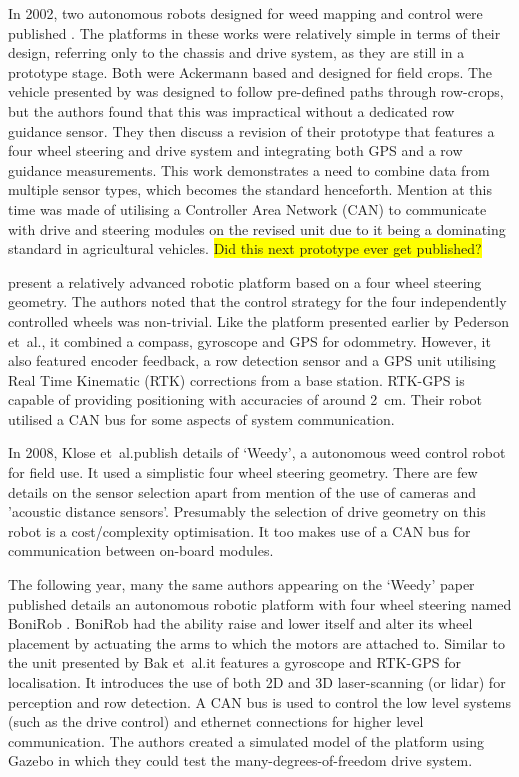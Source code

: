\documentclass[preprint,authoryear,12pt]{elsarticle}
\begin{document}
    In 2002, two autonomous robots designed for weed mapping and control were published \citep{Pedersen2002,Astrand2002}.
    The platforms in these works were relatively simple in terms of their design, referring only to the chassis and drive system, as they are still in a prototype stage.
    Both were Ackermann based and designed for field crops.
    The vehicle presented by \cite{Pedersen2002} was designed to follow pre-defined paths through row-crops, but the authors found that this was impractical without a dedicated row guidance sensor.
    They then discuss a revision of their prototype that features a four wheel steering and drive system and integrating both GPS and a row guidance measurements.
    This work demonstrates a need to combine data from multiple sensor types, which becomes the standard henceforth.
    Mention at this time was made of utilising a Controller Area Network (CAN) to communicate with drive and steering modules on the revised unit due to it being a dominating standard in agricultural vehicles.
    \colorbox{yellow}{Did this next prototype ever get published?}
    
    
    \cite{Bak2004} present a relatively advanced robotic platform based on a four wheel steering geometry.
    The authors noted that the control strategy for the four independently controlled wheels was non-trivial.
    Like the platform presented earlier by Pederson et~al.\@, it combined a compass, gyroscope and GPS for odommetry.
    However, it also featured encoder feedback, a row detection sensor and a GPS unit utilising Real Time Kinematic (RTK) corrections from a base station.
    RTK-GPS is capable of providing positioning with accuracies of around \SI{2}{\centi\meter}.
    Their robot utilised a CAN bus for some aspects of system communication.

    In 2008, Klose et~al.\@ publish details of `Weedy', a autonomous weed control robot for field use.
    It used a simplistic four wheel steering geometry.
    There are few details on the sensor selection apart from mention of the use of cameras and 'acoustic distance sensors'.
    Presumably the selection of drive geometry on this robot is a cost/complexity optimisation.
    It too makes use of a CAN bus for communication between on-board modules.

    The following year, many the same authors appearing on the `Weedy' paper published details an autonomous robotic platform with four wheel steering named BoniRob \citep{Ruckelshausen2009}.
    BoniRob had the ability raise and lower itself and alter its wheel placement by actuating the arms to which the motors are attached to.
    Similar to the unit presented by Bak et~al.\@ it features a gyroscope and RTK-GPS for localisation.
    It introduces the use of both 2D and 3D laser-scanning (or lidar) for perception and row detection.
    A CAN bus is used to control the low level systems (such as the drive control) and ethernet connections for higher level communication.
    The authors created a simulated model of the platform using Gazebo in which they could test the many-degrees-of-freedom drive system.
\end{document}
